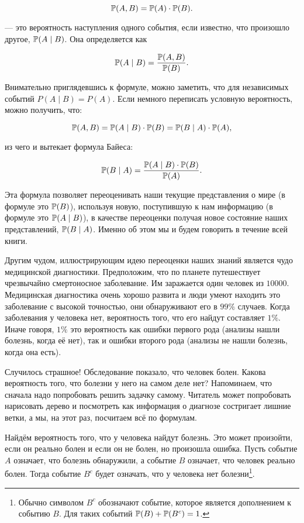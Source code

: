 \[ \mathbb{P}(A,B) = \mathbb{P}(A) \cdot \mathbb{P}(B).\]

 --- это вероятность наступления одного события, если известно, что произошло другое, $\mathbb{P}(A \mid B)$.  Она определяется как

\[ \mathbb{P}(A \mid B) = \frac{\mathbb{P}(A, B)}{\mathbb{P}(B)}.\]

Внимательно приглядевшись к формуле, можно заметить, что для независимых событий $P(A \mid B) = P(A).$  Если немного переписать условную вероятность, можно получить, что: 

\[ \mathbb{P}(A, B) = \mathbb{P}(A \mid B) \cdot \mathbb{P}(B) = \mathbb{P}(B \mid A) \cdot \mathbb{P}(A), \] 

из чего и вытекает формула Байеса:

\[ \mathbb{P}(B  \mid A) = \frac{\mathbb{P}(A \mid B) \cdot \mathbb{P}(B)}{\mathbb{P}(A)}.\]

Эта формула позволяет переоценивать наши текущие представления о мире (в формуле это $\mathbb{P}(B)$), используя новую, поступившую к нам информацию (в формуле это $\mathbb{P}(A \mid B)$), в качестве переоценки получая новое состояние наших представлений, $\mathbb{P}(B \mid A)$.  Именно об этом мы и будем говорить в течение всей книги.

Другим чудом, иллюстрирующим идею переоценки наших знаний является чудо медицинской диагностики.  Предположим, что по планете путешествует чрезвычайно смертоносное заболевание. Им заражается один человек из $10 000$.  Медицинская диагностика очень хорошо развита и люди умеют находить это заболевание с высокой точностью, они обнаруживают его в $99\%$ случаев. Когда заболевания у человека нет, вероятность того, что его найдут составляет $1\%$.  Иначе говоря, $1\%$ это вероятность как ошибки первого рода (анализы нашли болезнь, когда её нет), так и ошибки второго рода (анализы не нашли болезнь, когда она есть). 

Случилось страшное! Обследование показало, что человек болен. Какова вероятность того, что болезни у него на самом деле нет? Напоминаем, что сначала надо попробовать решить задачку самому. Читатель может попробовать нарисовать дерево и посмотреть как информация о диагнозе состригает лишние ветки, а мы, на этот раз, посчитаем всё по формулам.

Найдём вероятность того, что у человека найдут болезнь. Это может произойти, если он реально болен и если он не болен, но произошла ошибка.  Пусть событие $A$ означает, что болезнь обнаружили, а событие $B$ означает, что человек реально болен.  Тогда событие $B^{c}$ будет означать, что у человека нет болезни\footnote{Обычно символом $B^c$ обозначают событие, которое является дополнением к событию $B$. Для таких событий $\mathbb{P}(B) + \mathbb{P}(B^c) = 1$.}. 

